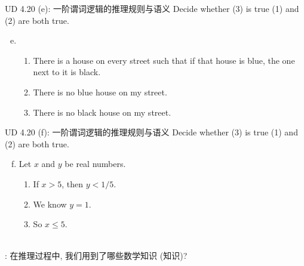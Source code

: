 \begin{frame}{}
  \begin{exampleblock}{UD 4.20 (e): 一阶谓词逻辑的推理规则与语义}
    Decide whether (3) is true  (1) and (2) are both true.

    \begin{enumerate}[(a)]
      \setcounter{enumi}{4}
      \item 
	\begin{enumerate}[(1)]
	  \item There is a house on every street such that if that house is blue,
	    the one next to it is black.
	  \item There is no blue house on my street.
	  \item There is no black house on my street.
	\end{enumerate}
    \end{enumerate}
  \end{exampleblock}

  \vspace{0.30cm}



\end{frame}

\begin{frame}{}
  \begin{exampleblock}{UD 4.20 (f): 一阶谓词逻辑的推理规则与语义}
    Decide whether (3) is true  (1) and (2) are both true.

    \begin{enumerate}[(a)]
      \setcounter{enumi}{5}
      \item Let $x$ and $y$ be real numbers.
	\begin{enumerate}[(1)]
	  \item If $x > 5$, then $y < 1/5$.
	  \item We know $y = 1$.
	  \item So $x \le 5$.
	\end{enumerate}
    \end{enumerate}
  \end{exampleblock}

  \pause
  \vspace{0.30cm}
  \begin{center}
    {} \\[15pt] \pause
    {: 在推理过程中, 我们用到了哪些数学知识 (知识)?}
  \end{center}
\end{frame}

